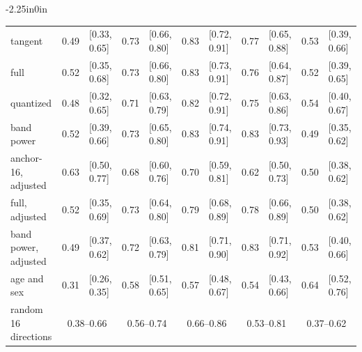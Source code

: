 \begin{table}[!ht]
\begin{adjustwidth}{-2.25in}{0in}
\begin{tabular}{@{}lr@{\hspace{6pt}}lr@{\hspace{6pt}}lr@{\hspace{6pt}}lr@{\hspace{6pt}}lr@{\hspace{6pt}}l@{}}
tangent & 0.49 & [0.33, 0.65] & 0.73\rlap{$^{*}$} & [0.66, 0.80] & 0.83\rlap{$^{*}$} & [0.72, 0.91] & 0.77\rlap{$^{*}$} & [0.65, 0.88] & 0.53 & [0.39, 0.66] \\
full & 0.52 & [0.35, 0.68] & 0.73\rlap{$^{*}$} & [0.66, 0.80] & 0.83\rlap{$^{*}$} & [0.73, 0.91] & 0.76\rlap{$^{*}$} & [0.64, 0.87] & 0.52 & [0.39, 0.65] \\
quantized & 0.48 & [0.32, 0.65] & 0.71\rlap{$^{*}$} & [0.63, 0.79] & 0.82\rlap{$^{*}$} & [0.72, 0.91] & 0.75\rlap{$^{*}$} & [0.63, 0.86] & 0.54 & [0.40, 0.67] \\
band power & 0.52 & [0.39, 0.66] & 0.73\rlap{$^{*}$} & [0.65, 0.80] & 0.83\rlap{$^{*}$} & [0.74, 0.91] & 0.83\rlap{$^{*}$} & [0.73, 0.93] & 0.49 & [0.35, 0.62] \\
anchor-16, adjusted & 0.63 & [0.50, 0.77] & 0.68\rlap{$^{*}$} & [0.60, 0.76] & 0.70\rlap{$^{*}$} & [0.59, 0.81] & 0.62\rlap{$^{*}$} & [0.50, 0.73] & 0.50 & [0.38, 0.62] \\
full, adjusted & 0.52 & [0.35, 0.69] & 0.73\rlap{$^{*}$} & [0.64, 0.80] & 0.79\rlap{$^{*}$} & [0.68, 0.89] & 0.78\rlap{$^{*}$} & [0.66, 0.89] & 0.50 & [0.38, 0.62] \\
band power, adjusted & 0.49 & [0.37, 0.62] & 0.72\rlap{$^{*}$} & [0.63, 0.79] & 0.81\rlap{$^{*}$} & [0.71, 0.90] & 0.83\rlap{$^{*}$} & [0.71, 0.92] & 0.53 & [0.40, 0.66] \\
age and sex & 0.31 & [0.26, 0.35] & 0.58\rlap{$^{*}$} & [0.51, 0.65] & 0.57 & [0.48, 0.67] & 0.54 & [0.43, 0.66] & 0.64\rlap{$^{*}$} & [0.52, 0.76] \\
\midrule random 16 directions & \multicolumn{2}{c}{0.38--0.66} & \multicolumn{2}{c}{0.56--0.74} & \multicolumn{2}{c}{0.66--0.86} & \multicolumn{2}{c}{0.53--0.81} & \multicolumn{2}{c}{0.37--0.62} \\
\bottomrule
\end{tabular}

\end{adjustwidth}
\end{table}
